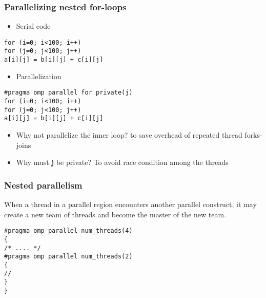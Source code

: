 \documentclass{beamer}
\begin{document}
\begin{frame}
\frametitle{Parallelizing nested for-loops}

\begin{block}{}

\begin{itemize}
 \item Serial code
\end{itemize}

\noindent
\begin{verbatim}
for (i=0; i<100; i++)
for (j=0; j<100; j++)
a[i][j] = b[i][j] + c[i][j]
\end{verbatim}

\begin{itemize}
\item Parallelization
\end{itemize}

\noindent
\begin{verbatim}
#pragma omp parallel for private(j)
for (i=0; i<100; i++)
for (j=0; j<100; j++)
a[i][j] = b[i][j] + c[i][j]
\end{verbatim}

\begin{itemize}
\item Why not parallelize the inner loop? to save overhead of repeated thread forks-joins

\item Why must \textbf{j} be private? To avoid race condition among the threads
\end{itemize}

\noindent
\end{block}
\end{frame}

\begin{frame}
\frametitle{Nested parallelism}

\begin{block}{}
When a thread in a parallel region encounters another parallel construct, it
may create a new team of threads and become the master of the new
team.
\begin{verbatim}
#pragma omp parallel num_threads(4)
{
/* .... */
#pragma omp parallel num_threads(2)
{
//  
}
}
\end{verbatim}
\end{block}
\end{frame}
\end{document}
